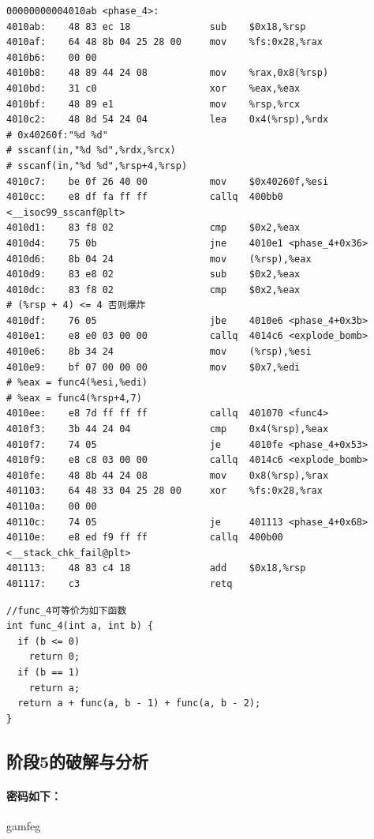 \begin{verbatim}
00000000004010ab <phase_4>:
4010ab:    48 83 ec 18              sub    $0x18,%rsp
4010af:    64 48 8b 04 25 28 00     mov    %fs:0x28,%rax
4010b6:    00 00 
4010b8:    48 89 44 24 08           mov    %rax,0x8(%rsp)
4010bd:    31 c0                    xor    %eax,%eax
4010bf:    48 89 e1                 mov    %rsp,%rcx
4010c2:    48 8d 54 24 04           lea    0x4(%rsp),%rdx
# 0x40260f:"%d %d"
# sscanf(in,"%d %d",%rdx,%rcx)
# sscanf(in,"%d %d",%rsp+4,%rsp)
4010c7:    be 0f 26 40 00           mov    $0x40260f,%esi
4010cc:    e8 df fa ff ff           callq  400bb0 <__isoc99_sscanf@plt>
4010d1:    83 f8 02                 cmp    $0x2,%eax
4010d4:    75 0b                    jne    4010e1 <phase_4+0x36>
4010d6:    8b 04 24                 mov    (%rsp),%eax
4010d9:    83 e8 02                 sub    $0x2,%eax
4010dc:    83 f8 02                 cmp    $0x2,%eax
# (%rsp + 4) <= 4 否则爆炸
4010df:    76 05                    jbe    4010e6 <phase_4+0x3b>
4010e1:    e8 e0 03 00 00           callq  4014c6 <explode_bomb>
4010e6:    8b 34 24                 mov    (%rsp),%esi
4010e9:    bf 07 00 00 00           mov    $0x7,%edi
# %eax = func4(%esi,%edi)
# %eax = func4(%rsp+4,7)
4010ee:    e8 7d ff ff ff           callq  401070 <func4>
4010f3:    3b 44 24 04              cmp    0x4(%rsp),%eax
4010f7:    74 05                    je     4010fe <phase_4+0x53>
4010f9:    e8 c8 03 00 00           callq  4014c6 <explode_bomb>
4010fe:    48 8b 44 24 08           mov    0x8(%rsp),%rax
401103:    64 48 33 04 25 28 00     xor    %fs:0x28,%rax
40110a:    00 00 
40110c:    74 05                    je     401113 <phase_4+0x68>
40110e:    e8 ed f9 ff ff           callq  400b00 <__stack_chk_fail@plt>
401113:    48 83 c4 18              add    $0x18,%rsp
401117:    c3                       retq   
\end{verbatim}

\begin{verbatim}
//func_4可等价为如下函数
int func_4(int a, int b) {
  if (b <= 0)
    return 0;
  if (b == 1)
    return a;
  return a + func(a, b - 1) + func(a, b - 2);
}
\end{verbatim}


\subsection{阶段5的破解与分析}

\paragraph{密码如下：}gamfeg

